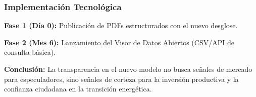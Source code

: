 \documentclass{cel}
\begin{document}
\subsubsection{Implementación Tecnológica}
\nopagebreak

\textbf{Fase 1 (Día 0):} Publicación de PDFs estructurados con el nuevo desglose.

\textbf{Fase 2 (Mes 6):} Lanzamiento del Visor de Datos Abiertos (CSV/API de consulta básica).



\textbf{Conclusión:} La transparencia en el nuevo modelo no busca \textquotedbl{}señales de mercado\textquotedbl{} para especuladores, sino \textquotedbl{}señales de certeza\textquotedbl{} para la inversión productiva y la confianza ciudadana en la transición energética.


\newpage
\contraportada
\end{document}
